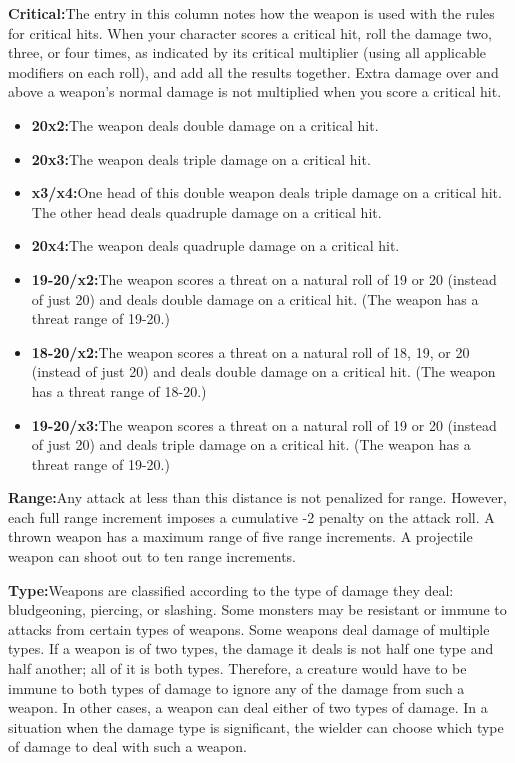 {\noindent\textbf{Critical:}{The entry in this column notes how the weapon is used with the rules for critical hits. When your character scores a critical hit, roll the damage two, three, or four times, as indicated by its critical multiplier (using all applicable modifiers on each roll), and add all the results together. Extra damage over and above a weapon's normal damage is not multiplied when you score a critical hit.}

\begin{itemize}
  \item\noindent\textbf{20x2:}{The weapon deals double damage on a critical hit.}
  \item\noindent\textbf{20x3:}{The weapon deals triple damage on a critical hit.}
  \item\noindent\textbf{x3/x4:}{One head of this double weapon deals triple damage on a critical hit. The other head deals quadruple damage on a critical hit.}
  \item\noindent\textbf{20x4:}{The weapon deals quadruple damage on a critical hit.}
  \item\noindent\textbf{19-20/x2:}{The weapon scores a threat on a natural roll of 19 or 20 (instead of just 20) and deals double damage on a critical hit. (The weapon has a threat range of 19-20.)}
  \item\noindent\textbf{18-20/x2:}{The weapon scores a threat on a natural roll of 18, 19, or 20 (instead of just 20) and deals double damage on a critical hit. (The weapon has a threat range of 18-20.)}
  \item\noindent\textbf{19-20/x3:}{The weapon scores a threat on a natural roll of 19 or 20 (instead of just 20) and deals triple damage on a critical hit. (The weapon has a threat range of 19-20.)}
\end{itemize}

\noindent\textbf{Range:}{Any attack at less than this distance is not penalized for range. However, each full range increment imposes a cumulative -2 penalty on the attack roll. A thrown weapon has a maximum range of five range increments. A projectile weapon can shoot out to ten range increments.}

\noindent\textbf{Type:}{Weapons are classified according to the type of damage they deal: bludgeoning, piercing, or slashing. Some monsters may be resistant or immune to attacks from certain types of weapons. Some weapons deal damage of multiple types. If a weapon is of two types, the damage it deals is not half one type and half another; all of it is both types. Therefore, a creature would have to be immune to both types of damage to ignore any of the damage from such a weapon.  In other cases, a weapon can deal either of two types of damage. In a situation when the damage type is significant, the wielder can choose which type of damage to deal with such a weapon.}

}
